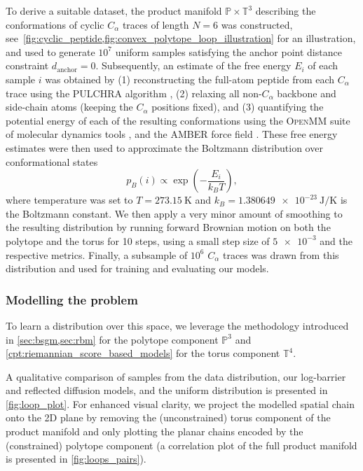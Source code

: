 To derive a suitable dataset, the product manifold \(\mathbb{P}\times\mathbb{T}^3\) describing the conformations of cyclic \(C_\alpha\) traces of length \(N=6\) was constructed, see~\cref{fig:cyclic_peptide,fig:convex_polytope_loop_illustration} for an illustration, and used to generate \(10^7\) uniform samples satisfying the anchor point distance constraint \(d_\text{anchor}=0\).
Subsequently, an estimate of the free energy \(E_i\) of each sample \(i\) was obtained by (1) reconstructing the full-atom peptide from each \(C_\alpha\) trace using the \textsc{PULCHRA} algorithm \parencite{rotkiewicz2008fast}, (2) relaxing all non-\(C_\alpha\) backbone and side-chain atoms (keeping the \(C_\alpha\) positions fixed), and (3) quantifying the potential energy of each of the resulting conformations using the \textsc{OpenMM} suite of molecular dynamics tools \parencite{eastman2017openmm}, and the \textsc{AMBER} force field \parencite{hornak2006comparison}.
These free energy estimates were then used to approximate the Boltzmann distribution over conformational states \[ \textstyle{ p_B(i) \propto \exp\left(-\frac{E_i}{k_BT}\right),} \] where temperature was set to \(T=\SI{273.15}{\kelvin}\) and \(k_B=\SI{1.380649e-23}{\joule\per\kelvin}\) is the Boltzmann constant.
We then apply a very minor amount of smoothing to the resulting distribution by running forward Brownian motion on both the polytope and the torus for 10 steps, using a small step size of \(\num{5e-3}\) and the respective metrics.
Finally, a subsample of \(10^6\) \(C_\alpha\) traces was drawn from this distribution and used for training and evaluating our models.

\subsubsection{Modelling the problem}
To learn a distribution over this space, we leverage the methodology introduced in \cref{sec:bsgm,sec:rbm} for the polytope component \(\mathbb{P}^3\) and \cref{cpt:riemannian_score_based_models} for the torus component \(\mathbb{T}^4\).

A qualitative comparison of samples from the data distribution, our log-barrier and reflected diffusion models, and the uniform distribution is presented in \cref{fig:loop_plot}.
For enhanced visual clarity, we project the modelled spatial chain onto the 2D plane by removing the (unconstrained) torus component of the product manifold and only plotting the planar chains encoded by the (constrained) polytope component (a correlation plot of the full product manifold is presented in \cref{fig:loops_pairs}).

